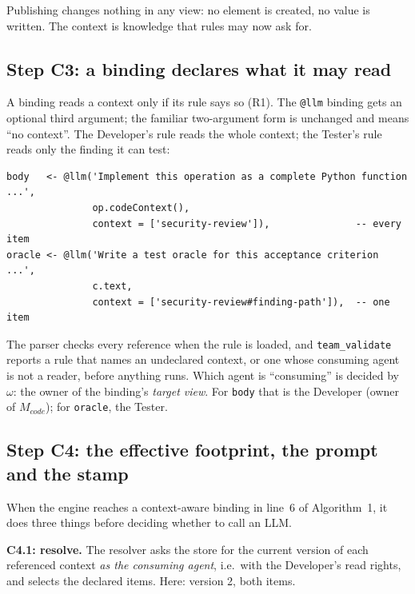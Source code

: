 \documentclass[10pt,a4paper]{article}
\newcommand{\code}[1]{\texttt{#1}}
\theoremstyle{definition}
\newcommand{\what}[1]{\par\smallskip\noindent\textbf{#1}\quad}
\begin{document}
\noindent Publishing changes nothing in any view: no element is created, no
value is written. The context is knowledge that rules may now ask for.

\subsection{Step C3: a binding declares what it may read}

A binding reads a context only if its rule says so (R1). The \code{@llm}
binding gets an optional third argument; the familiar two-argument form is
unchanged and means ``no context''. The Developer's rule reads the whole
context; the Tester's rule reads only the finding it can test:

\begin{lstlisting}[language=ATL, style=model, caption={Context-aware variants of \code{Arch2Code} and \code{Req2Test} (changes in the last argument only).}, label={lst:ctx-rules}]
body   <- @llm('Implement this operation as a complete Python function ...',
               op.codeContext(),
               context = ['security-review']),               -- every item
oracle <- @llm('Write a test oracle for this acceptance criterion ...',
               c.text,
               context = ['security-review#finding-path']),  -- one item
\end{lstlisting}

\noindent The parser checks every reference when the rule is loaded, and
\code{team\_validate} reports a rule that names an undeclared context, or one
whose consuming agent is not a reader, before anything runs. Which agent is
``consuming'' is decided by $\omega$: the owner of the binding's \emph{target
view}. For \code{body} that is the Developer (owner of $M_{\mathit{code}}$);
for \code{oracle}, the Tester.

\subsection{Step C4: the effective footprint, the prompt and the stamp}\label{sec:context-stamp}

When the engine reaches a context-aware binding in line~6 of Algorithm~1, it
does three things before deciding whether to call an LLM.

\what{C4.1: resolve.} The resolver asks the store for the current version of
each referenced context \emph{as the consuming agent}, i.e.\ with the
Developer's read rights, and selects the declared items. Here: version 2,
both items.
\end{document}
